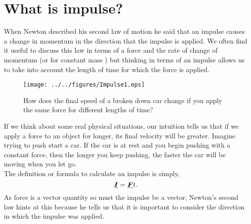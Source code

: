 




\addtolength{\topmargin}{-0.7 cm}
\setlength{\columnsep}{22pt}


\section{What is impulse?}
When Newton described his second law of motion he said that an impulse causes a change in momentum in the direction that the impulse is applied.  We often find it useful to discuss this law in terms of a  force and the rate of change of momentum (or for constant mass ) but thinking in terms of an impulse allows us to take into account the length of time for which the force is applied.\\

\begin{wrapfigure}{r}{7cm}
\center
\texttt{[image: ../../figures/Impulse1.eps]}
\caption{How does the final speed of a broken down car change if you apply the same force for different lengths of time?}\vspace{1.0cm}
\end{wrapfigure} 

\noindent If we think about some real physical situations, our intuition tells us that if we apply a force to an object for longer, its final velocity will be greater.  Imagine trying to push start a car.  If the car is at rest and you begin pushing with a constant force, then the longer you keep pushing, the faster the car will be moving when you let go.\\

\noindent The definition or formula to calculate an impulse is simply,
\begin{equation}
{\mathit{\underline{\boldsymbol{I}}}}={\mathit{\underline{\boldsymbol{F}}}}{t}.
\end {equation}
As force is a vector quantity so must the impulse be a vector; Newton's second law hints at this because he tells us that it is important to consider the direction in which the impulse was applied.


